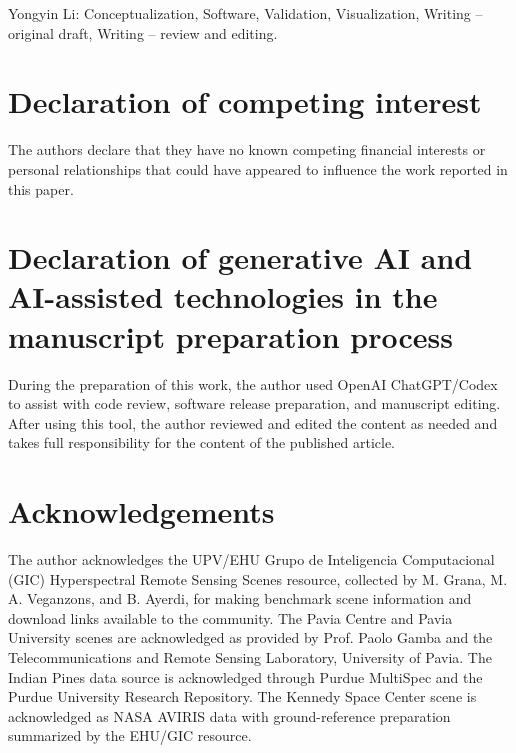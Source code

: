 \documentclass[preprint,12pt,a4paper]{elsarticle}
\begin{document}
Yongyin Li: Conceptualization, Software, Validation, Visualization, Writing --
original draft, Writing -- review and editing.

\section*{Declaration of competing interest}

The authors declare that they have no known competing financial interests or
personal relationships that could have appeared to influence the work reported
in this paper.

\section*{Declaration of generative AI and AI-assisted technologies in the manuscript preparation process}

During the preparation of this work, the author used OpenAI ChatGPT/Codex to
assist with code review, software release preparation, and manuscript editing.
After using this tool, the author reviewed and edited the content as needed and
takes full responsibility for the content of the published article.

\section*{Acknowledgements}

The author acknowledges the UPV/EHU Grupo de Inteligencia Computacional (GIC)
Hyperspectral Remote Sensing Scenes resource, collected by M. Grana, M. A.
Veganzons, and B. Ayerdi, for making benchmark scene information and download
links available to the community. The Pavia Centre and Pavia University scenes
are acknowledged as provided by Prof. Paolo Gamba and the Telecommunications
and Remote Sensing Laboratory, University of Pavia. The Indian Pines data
source is acknowledged through Purdue MultiSpec and the Purdue University
Research Repository. The Kennedy Space Center scene is acknowledged as NASA
AVIRIS data with ground-reference preparation summarized by the EHU/GIC
resource.
\end{document}

